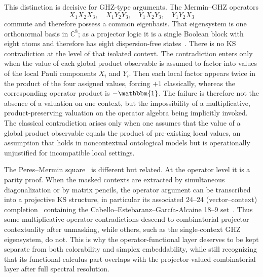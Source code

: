 \documentclass[aps,pra,twocolumn,superscriptaddress,nofootinbib]{revtex4-2}
\newcommand{\id}{\mathbbm{1}}
\newcommand{\complex}{\mathbb{C}}
\begin{document}
This distinction is decisive for GHZ-type arguments.  The Mermin--GHZ operators
\begin{equation}
X_1X_2X_3,\quad X_1Y_2Y_3,\quad Y_1X_2Y_3,\quad Y_1Y_2X_3
\end{equation}
commute and therefore possess a common eigenbasis.  That eigensystem is one orthonormal basis in $\complex^8$; as a projector logic it is a single Boolean block with eight atoms and therefore has eight dispersion-free states~\cite{svozil-2024-convert-pra-externalfigures}.  There is no KS contradiction at the level of that isolated context.  The contradiction enters only when the value of each global product observable is assumed to factor into values of the local Pauli components $X_i$ and $Y_i$.  Then each local factor appears twice in the product of the four assigned values, forcing $+1$ classically, whereas the corresponding operator product is $-\id$.  The failure is therefore not the absence of a valuation on one context, but the impossibility of a multiplicative, product-preserving valuation on the operator algebra being implicitly invoked.
The classical contradiction arises only when one assumes that the value of a global product observable equals the product of pre-existing local values, an assumption that holds in noncontextual ontological models but is operationally unjustified for incompatible local settings.

The Peres--Mermin square~\cite{peres111,mermin90b,peres-91}
is different but related.  At the operator level it is a parity proof.
When the masked contexts are extracted by simultaneous diagonalization or by matrix pencils,
the operator argument can be transcribed into a projective KS structure,
in particular its associated 24--24 (vector--context) completion~\cite{Pavicic-2005,svozil-2024-convert-pra-externalfigures}  containing the Cabello--Estebaranz--Garc\'ia-Alcaine 18--9 set~\cite{cabello-96,svozil-2024-convert-pra-externalfigures}.  Thus some multiplicative operator contradictions descend to combinatorial projector contextuality after unmasking, while others, such as the single-context GHZ eigensystem, do not.  This is why the operator-functional layer deserves to be kept separate from both colorability and simplex embeddability, while still recognizing that its functional-calculus part overlaps with the projector-valued combinatorial layer after full spectral resolution.
\end{document}
